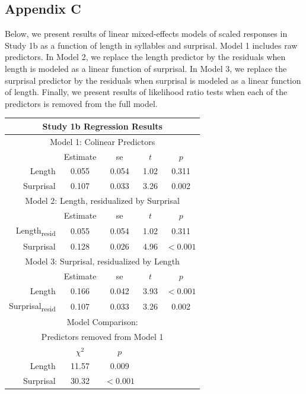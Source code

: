 \subsection{Appendix C}

Below, we present results of linear mixed-effects models of scaled responses in Study 1b as a function of length in syllables and surprisal.
Model 1 includes raw predictors.
In Model 2, we replace the length predictor by the residuals when length is modeled as a linear function of surprisal.
In Model 3, we replace the surprisal predictor by the residuals when surprisal is modeled as a linear function of length.
Finally, we present results of likelihood ratio tests when each of the predictors is removed from the full model.

\vspace{4mm}

\noindent
\footnotesize{
\begin{tabular}{r|cccc}
\hline
\hline
\multicolumn{5}{c}{\textbf{Study 1b Regression Results}} \\
\hline
\hline
\multicolumn{5}{c}{Model 1: Colinear Predictors} \\
& Estimate & se & $t$ & $p$ \\
\hline
Length & 0.055 & 0.054 & 1.02 & 0.311 \\
Surprisal & 0.107 & 0.033 & 3.26 & 0.002 \\
\hline
\hline
\multicolumn{5}{c}{Model 2: Length, residualized by Surprisal} \\
& Estimate & se & $t$ & $p$ \\
\hline
Length\textsubscript{resid} & 0.055 & 0.054 & 1.02 & 0.311 \\
Surprisal & 0.128 & 0.026 & 4.96 & $<0.001$ \\
\hline
\hline
\multicolumn{5}{c}{Model 3: Surprisal, residualized by Length} \\
& Estimate & se & $t$ & $p$ \\
\hline
Length & 0.166 & 0.042 & 3.93 & $<0.001$ \\
Surprisal\textsubscript{resid} & 0.107 & 0.033 & 3.26 & 0.002 \\
\hline
\hline
\multicolumn{5}{c}{Model Comparison:} \\
\multicolumn{5}{c}{Predictors removed from Model 1} \\
& $\chi^2$ & $p$ \\
\hline
Length & 11.57 & 0.009 \\
Surprisal & 30.32 & $<0.001$ \\
\hline
\hline
\end{tabular}
}



